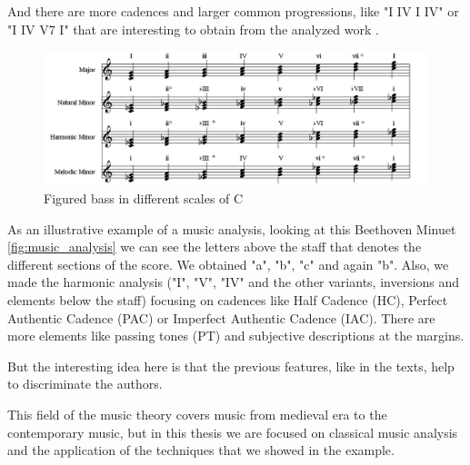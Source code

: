 \documentclass[a4paper,openany,oneside,12pt]{book}
\begin{document}
And there are more cadences and larger common progressions, like "I IV I IV" or "I IV V7 I" that are interesting to obtain from the analyzed work \cite{jacmuse}.

\begin{figure}
\centering
\includegraphics[width=\textwidth]{img/scales.png} 
\caption{Figured bass in different scales of C} \label{fig:scales}
\end{figure}

As an illustrative example of a music analysis, looking at this Beethoven Minuet \ref{fig:music_analysis} we can see the letters above the staff that denotes the different sections of the score. We obtained "a", "b", "c" and again "b". Also, we made the harmonic analysis ("I", "V", "IV" and the other variants, inversions and elements below the staff) focusing on cadences like Half Cadence (HC), Perfect Authentic Cadence (PAC) or Imperfect Authentic Cadence (IAC). There are more elements like passing tones (PT) and subjective descriptions at the margins.

But the interesting idea here is that the previous features, like in the texts, help to discriminate the authors.

This field of the music theory covers music from medieval era to the contemporary music, but in this thesis we are focused on classical music analysis and the application of the techniques that we showed in the example.
\end{document}
